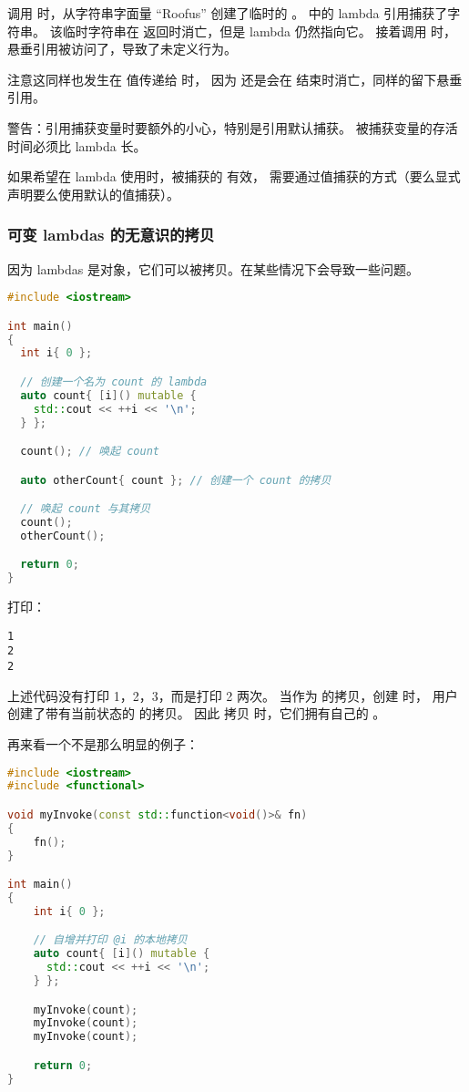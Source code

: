 \documentclass[../../LearnCpp.tex]{subfiles}
\begin{document}
调用  时，从字符串字面量 “Roofus” 创建了临时的  。
 中的 lambda 引用捕获了字符串。
该临时字符串在  返回时消亡，但是 lambda 仍然指向它。
接着调用  时，悬垂引用被访问了，导致了未定义行为。

注意这同样也发生在  值传递给  时，
因为  还是会在  结束时消亡，同样的留下悬垂引用。

警告：引用捕获变量时要额外的小心，特别是引用默认捕获。
被捕获变量的存活时间必须比 lambda 长。

如果希望在 lambda 使用时，被捕获的  有效，
需要通过值捕获的方式（要么显式声明要么使用默认的值捕获）。

\subsubsection*{可变 lambdas 的无意识的拷贝}

因为 lambdas 是对象，它们可以被拷贝。在某些情况下会导致一些问题。

\begin{lstlisting}[language=C++]
#include <iostream>

int main()
{
  int i{ 0 };

  // 创建一个名为 count 的 lambda
  auto count{ [i]() mutable {
    std::cout << ++i << '\n';
  } };

  count(); // 唤起 count

  auto otherCount{ count }; // 创建一个 count 的拷贝

  // 唤起 count 与其拷贝
  count();
  otherCount();

  return 0;
}
\end{lstlisting}

打印：

\begin{lstlisting}
1
2
2
\end{lstlisting}

上述代码没有打印 1，2，3，而是打印 2 两次。
当作为  的拷贝，创建  时，
用户创建了带有当前状态的  的拷贝。
因此  拷贝  时，它们拥有自己的  。

再来看一个不是那么明显的例子：

\begin{lstlisting}[language=C++]
#include <iostream>
#include <functional>

void myInvoke(const std::function<void()>& fn)
{
    fn();
}

int main()
{
    int i{ 0 };

    // 自增并打印 @i 的本地拷贝
    auto count{ [i]() mutable {
      std::cout << ++i << '\n';
    } };

    myInvoke(count);
    myInvoke(count);
    myInvoke(count);

    return 0;
}
\end{lstlisting}
\end{document}
